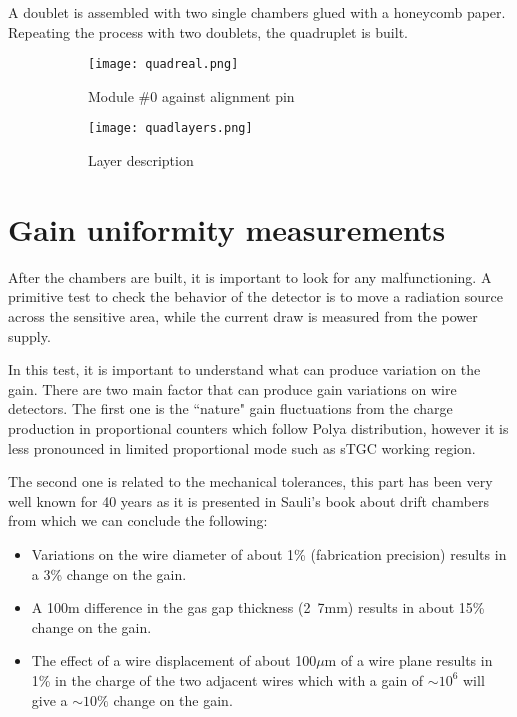 A doublet is assembled with two single chambers glued with a honeycomb paper. Repeating the process with two doublets,
the quadruplet is built.
\begin{figure}[ht]
\centering
\hspace*{\fill}
{\begin{subfigure}[b]{0.55\textwidth}
\texttt{[image: quadreal.png]}
\caption{Module \#0 against alignment pin}\label{}
\end{subfigure}
}\hfill
{\begin{subfigure}[b]{0.35\textwidth}
\texttt{[image: quadlayers.png]}
\caption{Layer description}\label{quad}
\end{subfigure}
}\hspace*{\fill}
\caption{}
\end{figure}


\section{Gain uniformity measurements}

After the chambers are built, it is important to look for any malfunctioning. A primitive test to check the behavior of
the detector is to move a radiation source across the sensitive area, while the current draw is measured from the
power supply.\par

In this test, it is important to understand what can produce variation on the gain. There are two main factor that can
produce gain variations on wire detectors. The first one is the ``nature" gain fluctuations from the charge production
in proportional counters which follow Polya distribution, however it is less pronounced in limited proportional mode such
as sTGC working region.\par

The second one is related to the mechanical tolerances, this part has been very well known for 40 years as it is
presented in
Sauli's book \cite{sauli} about drift chambers from which we can conclude the following:
\begin{itemize}
\item Variations on the wire diameter of about 1\% (fabrication precision) results in a 3\% change on the gain.
\item A \unit{100}{\micro m} difference in the gas gap thickness (\unit{2.7}{mm}) results in about 15\% change on the gain.
\item The effect of a wire displacement of about \unit{100}{$\mu$m}
of a wire plane results in 1\% in the charge of the two adjacent wires which with a gain of $\sim10^6$ will give a
$\sim10\%$ change on the gain.
\end{itemize}

